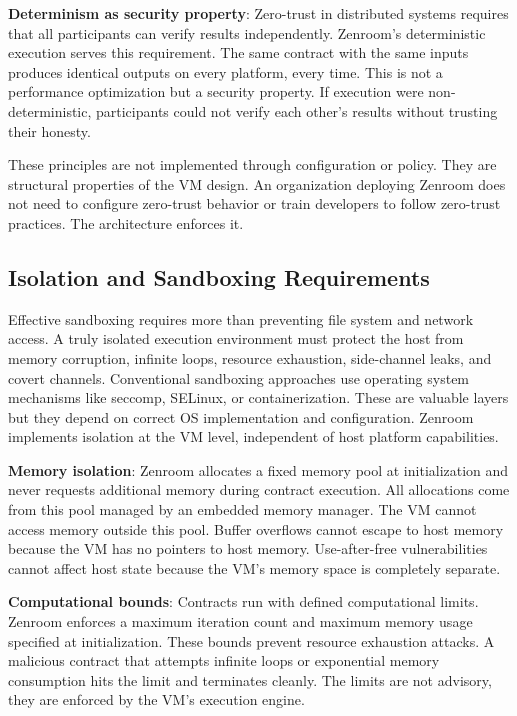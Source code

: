\textbf{Determinism as security property}: Zero-trust in distributed
systems requires that all participants can verify results
independently. Zenroom's deterministic execution serves this
requirement. The same contract with the same inputs produces identical
outputs on every platform, every time. This is not a performance
optimization but a security property. If execution were
non-deterministic, participants could not verify each other's results
without trusting their honesty.

These principles are not implemented through configuration or
policy. They are structural properties of the VM design. An
organization deploying Zenroom does not need to configure zero-trust
behavior or train developers to follow zero-trust practices. The
architecture enforces it.

\subsection{Isolation and Sandboxing Requirements}

Effective sandboxing requires more than preventing file system and
network access. A truly isolated execution environment must protect
the host from memory corruption, infinite loops, resource exhaustion,
side-channel leaks, and covert channels. Conventional sandboxing
approaches use operating system mechanisms like seccomp, SELinux, or
containerization. These are valuable layers but they depend on correct
OS implementation and configuration. Zenroom implements isolation at
the VM level, independent of host platform capabilities.

\textbf{Memory isolation}: Zenroom allocates a fixed memory pool at
initialization and never requests additional memory during contract
execution. All allocations come from this pool managed by an embedded
memory manager. The VM cannot access memory outside this pool. Buffer
overflows cannot escape to host memory because the VM has no pointers
to host memory. Use-after-free vulnerabilities cannot affect host
state because the VM's memory space is completely separate.

\textbf{Computational bounds}: Contracts run with defined
computational limits. Zenroom enforces a maximum iteration count and
maximum memory usage specified at initialization. These bounds prevent
resource exhaustion attacks. A malicious contract that attempts
infinite loops or exponential memory consumption hits the limit and
terminates cleanly. The limits are not advisory, they are enforced by
the VM's execution engine.

